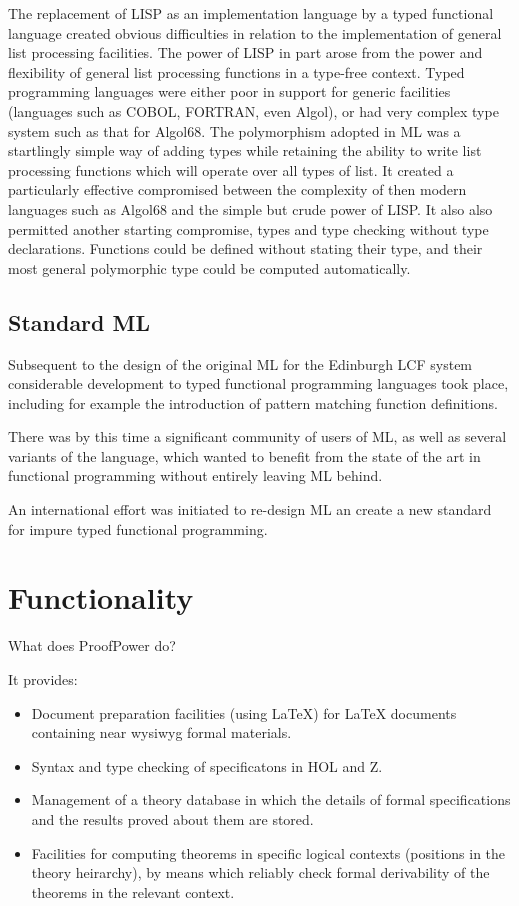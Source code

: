 \documentclass{rbjk}
\begin{document}
\begin{article}
The replacement of LISP as an implementation language by a typed
functional language created obvious difficulties in relation to the
implementation of general list processing facilities.
The power of LISP in part arose from the power and flexibility of
general list processing functions in a type-free context.
Typed programming languages were either poor in support for generic
facilities (languages such as COBOL, FORTRAN, even Algol), or had very
complex type system such as that for Algol68.
The polymorphism adopted in ML was a startlingly simple way of adding
types while retaining the ability to write list processing functions
which will operate over all types of list.
It created a particularly effective compromised between the complexity
of then modern languages such as Algol68 and the simple but crude
power of LISP.
It also also permitted another starting compromise, types and type
checking without type declarations.
Functions could be defined without stating their type, and their most
general polymorphic type could be computed automatically.

\subsection{Standard ML}

Subsequent to the design of the original ML for the Edinburgh LCF
system considerable development to typed functional programming
languages took place, including for example the introduction of 
pattern matching function definitions.

There was by this time a significant community of users of ML, as well
as several variants of the language, which wanted to benefit from the
state of the art in functional programming without entirely leaving ML
behind.

An international effort was initiated to re-design ML an create a new
standard for impure typed functional programming.

\section{Functionality}

What does ProofPower do?

It provides:
\begin{itemize}
\item Document preparation facilities (using \LaTeX) for \LaTeX
  documents containing near wysiwyg formal materials.
\item Syntax and type checking of specificatons in HOL and Z.
\item Management of a theory database in which the details of formal
  specifications and the results proved about them are stored.
\item Facilities for computing theorems in specific logical contexts
  (positions in the theory heirarchy), by means which reliably check
  formal derivability of the theorems in the relevant context.
\end{itemize}


\end{article}
\end{document}
